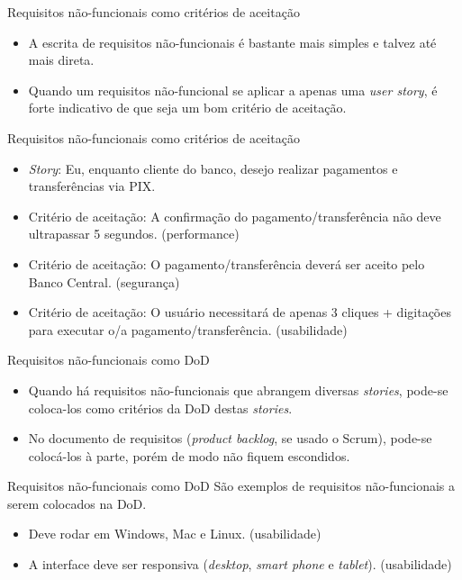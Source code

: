 \documentclass[11pt]{beamer}
\begin{document}
   \begin{frame}{Requisitos não-funcionais como critérios de aceitação}
      \begin{itemize}
         \item A escrita de requisitos não-funcionais é bastante mais simples e talvez até mais direta.
         \item Quando um requisitos não-funcional se aplicar a apenas uma \textit{user story}, é forte indicativo de que seja um bom critério de aceitação.
      \end{itemize}
   \end{frame}

   \begin{frame}{Requisitos não-funcionais como critérios de aceitação}
      \begin{itemize}
         \item \textit{Story}: Eu, enquanto cliente do banco, desejo realizar pagamentos e transferências via PIX.
         \item Critério de aceitação: A confirmação do pagamento/transferência não deve ultrapassar 5 segundos. (performance)
         \item Critério de aceitação: O pagamento/transferência deverá ser aceito pelo Banco Central. (segurança)
         \item Critério de aceitação: O usuário necessitará de apenas 3 cliques + digitações para executar o/a pagamento/transferência. (usabilidade) 
      \end{itemize}
   \end{frame}

   \begin{frame}{Requisitos não-funcionais como DoD}
      \begin{itemize}
         \item Quando há requisitos não-funcionais que abrangem diversas \textit{stories}, pode-se coloca-los como critérios da DoD destas \textit{stories}.
         \item No documento de requisitos (\textit{product backlog}, se usado o Scrum), pode-se colocá-los à parte, porém de modo não fiquem escondidos.
      \end{itemize}
   \end{frame}

   \begin{frame}{Requisitos não-funcionais como DoD}
      São exemplos de requisitos não-funcionais a serem colocados na DoD.
      \begin{itemize}
         \item Deve rodar em Windows, Mac e Linux. (usabilidade)
         \item A interface deve ser responsiva (\textit{desktop}, \textit{smart phone} e \textit{tablet}). (usabilidade)
      \end{itemize}
   \end{frame}
\end{document}
